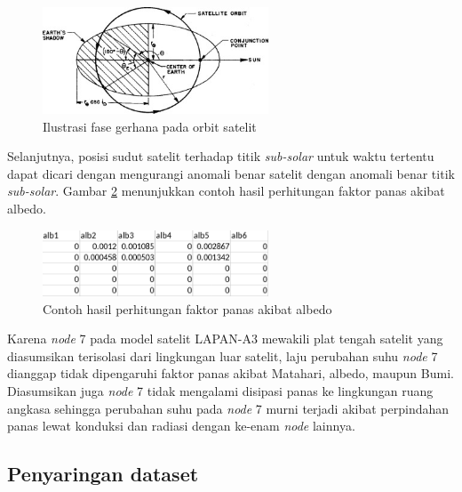 \begin{figure}[H]
\setlength{}
\begin{center}
\includegraphics[width=0.6\textwidth]{fig/ssp.jpg}
	\caption{Ilustrasi fase gerhana pada orbit satelit \cite{ismail2015}}
\label{fig:ssp}
\end{center}
\end{figure}

Selanjutnya, posisi sudut satelit terhadap titik \textit{sub-solar} untuk waktu
tertentu dapat dicari dengan mengurangi anomali benar satelit dengan anomali
benar titik \textit{sub-solar}. Gambar \ref{fig:albedofactor} menunjukkan
contoh hasil perhitungan faktor panas akibat albedo.

\begin{figure}[H]
\setlength{}
\begin{center}
\includegraphics[width=0.6\textwidth]{fig/albedofactor.png}
\caption{Contoh hasil perhitungan faktor panas akibat albedo}
\label{fig:albedofactor}
\end{center}
\end{figure}

Karena \textit{node} 7 pada model satelit LAPAN-A3 mewakili plat tengah satelit
yang diasumsikan terisolasi dari lingkungan luar satelit, laju perubahan suhu
\textit{node} 7 dianggap tidak dipengaruhi faktor panas akibat Matahari,
albedo, maupun Bumi. Diasumsikan juga \textit{node} 7 tidak mengalami disipasi
panas ke lingkungan ruang angkasa sehingga perubahan suhu pada \textit{node} 7
murni terjadi akibat perpindahan panas lewat konduksi dan radiasi dengan
ke-enam \textit{node} lainnya.

\subsection{Penyaringan dataset}


